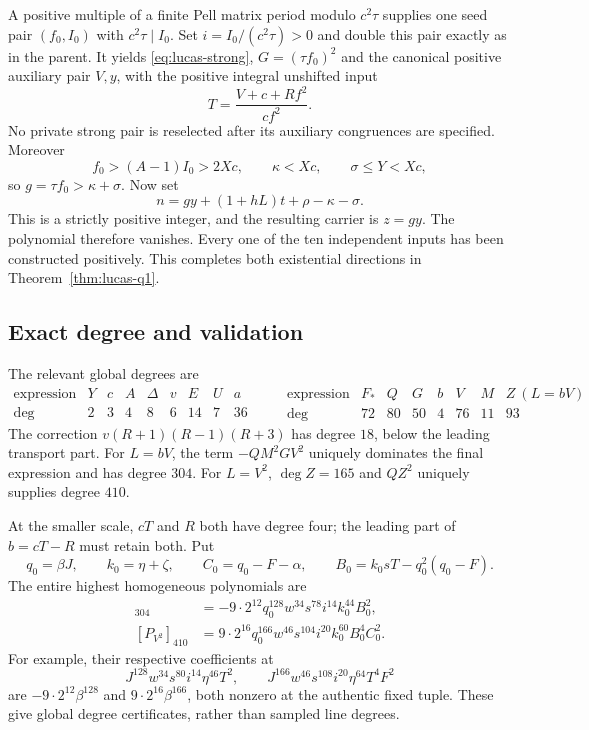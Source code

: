A positive multiple of a finite Pell matrix period modulo $c^2\tau$
supplies one seed pair $(f_0,I_0)$ with $c^2\tau\mid I_0$.
Set $i=I_0/(c^2\tau)>0$ and double this pair exactly as in the parent.
It yields \eqref{eq:lucas-strong}, $G=(\tau f_0)^2$ and the canonical
positive auxiliary pair $V,y$, with the positive integral unshifted input
\[
 T=\frac{V+c+Rf^2}{cf^2}.
\]
No private strong pair is reselected after its auxiliary congruences are
specified.  Moreover
\[
 f_0>(A-1)I_0>2Xc,\qquad \kappa<Xc,\qquad \sigma\le Y<Xc,
\]
so $g=\tau f_0>\kappa+\sigma$.  Now set
\[
 n=gy+(1+hL)t+\rho-\kappa-\sigma.
\]
This is a strictly positive integer, and the resulting carrier is $z=gy$.
The polynomial therefore vanishes.  Every one of the ten independent
inputs has been constructed positively.  This completes both existential
directions in Theorem~\ref{thm:lucas-q1}.

\subsection{Exact degree and validation}

The relevant global degrees are
\[
 \begin{array}{c|rrrrrrrr}
 \text{expression}&Y&c&A&\Delta&v&E&U&a\\\hline
 \deg&2&3&4&8&6&14&7&36
 \end{array}
 \qquad
 \begin{array}{c|rrrrrrr}
 \text{expression}&F_*&Q&G&b&V&M&Z\ (L=bV)\\\hline
 \deg&72&80&50&4&76&11&93
 \end{array}
\]
The correction $v(R+1)(R-1)(R+3)$ has degree $18$, below the leading
transport part.  For $L=bV$, the term $-QM^2GV^2$ uniquely dominates the
final expression and has degree $304$.  For $L=V^2$, $\deg Z=165$ and
$QZ^2$ uniquely supplies degree $410$.

At the smaller scale, $cT$ and $R$ both have degree four; the leading part
of $b=cT-R$ must retain both.  Put
\[
 q_0=\beta J,\qquad k_0=\eta+\zeta,\qquad C_0=q_0-F-\alpha,
 \qquad B_0=k_0sT-q_0^2(q_0-F).
\]
The entire highest homogeneous polynomials are
\begin{align*}
 [P_{bV}]_{304}
   &=-9\cdot2^{12}q_0^{128}w^{34}s^{78}i^{14}k_0^{44}B_0^2,\\
 [P_{V^2}]_{410}
   &=9\cdot2^{16}q_0^{166}w^{46}s^{104}i^{20}k_0^{60}B_0^4C_0^2.
\end{align*}
For example, their respective coefficients at
\[
 J^{128}w^{34}s^{80}i^{14}\eta^{46}T^2,\qquad
 J^{166}w^{46}s^{108}i^{20}\eta^{64}T^4F^2
\]
are $-9\cdot2^{12}\beta^{128}$ and
$9\cdot2^{16}\beta^{166}$, both nonzero at the authentic fixed tuple.
These give global degree certificates, rather than sampled line degrees.

